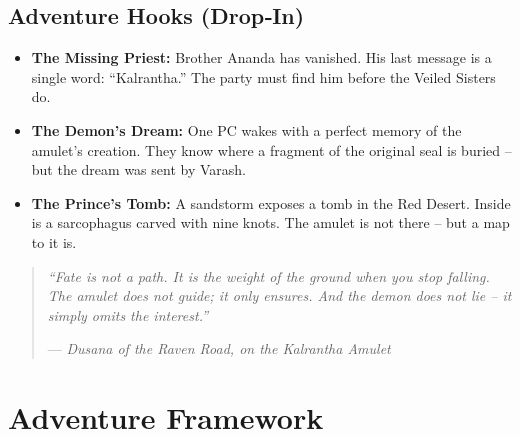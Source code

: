 \documentclass[11pt]{book}
\newenvironment{lorebox}{\begin{quote}\small\itshape}{\end{quote}}
\begin{document}
\section{Adventure Hooks (Drop‑In)}
\begin{itemize}
    \item \textbf{The Missing Priest:} Brother Ananda has vanished. His last message is a single word: “Kalrantha.” The party must find him before the Veiled Sisters do.
    \item \textbf{The Demon’s Dream:} One PC wakes with a perfect memory of the amulet’s creation. They know where a fragment of the original seal is buried – but the dream was sent by Varash.
    \item \textbf{The Prince’s Tomb:} A sandstorm exposes a tomb in the Red Desert. Inside is a sarcophagus carved with nine knots. The amulet is not there – but a map to it is.
\end{itemize}

\begin{lorebox}
“Fate is not a path. It is the weight of the ground when you stop falling. The amulet does not guide; it only ensures. And the demon does not lie – it simply omits the interest.”

--- \textit{Dusana of the Raven Road, on the Kalrantha Amulet}
\end{lorebox}

\clearpage
\chapter{Adventure Framework}
\end{document}
